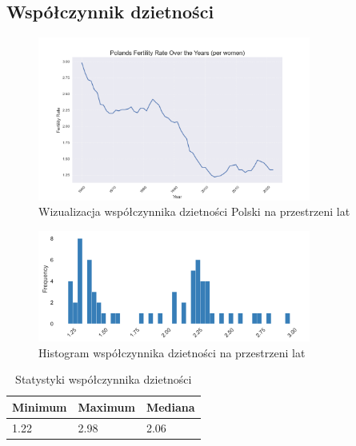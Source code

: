 \documentclass[11pt]{article}
\begin{document}
\subsection{Współczynnik dzietności}
\begin{figure}[H]
        \centering
        \includegraphics[width=0.8\textwidth]{polish_fertility_rate.png}
        \caption{Wizualizacja współczynnika dzietności Polski na przestrzeni lat}
\end{figure}
\begin{figure}[H]
        \centering
        \includegraphics[width=0.8\textwidth]{images/histogram_dzietnosc.png}
        \caption{Histogram współczynnika dzietności na przestrzeni lat}
\end{figure}
\begin{table}[H]
        \centering
        \begin{tabular}{|l|l|l|}
        \hline
        Minimum & Maximum & Mediana \\ \hline
        1.22 & 2.98 & 2.06 \\ \hline
        \end{tabular}
        \caption{Statystyki współczynnika dzietności}
        \end{table}
\end{document}
